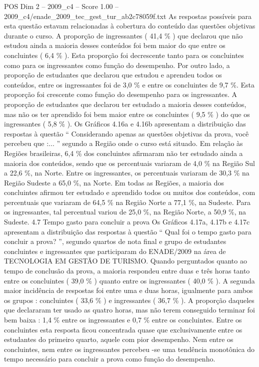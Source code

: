 \begin{textsample}{POS Dim 2 – 2009\_c4 – Score 1.00 – 2009\_c4/enade\_2009\_tec\_gest\_tur\_ab2c78059f.txt}
As respostas possíveis para esta questão estavam relacionadas à cobertura do conteúdo das questões objetivas durante o curso.
A proporção de ingressantes ( 41,4 \% ) que declarou que não estudou ainda a maioria desses conteúdos foi bem maior do que entre os concluintes ( 6,4 \% ).
Esta proporção foi decrescente tanto para os concluintes como para os ingressantes como função do desempenho.
Por outro lado, a proporção de estudantes que declarou que estudou e aprendeu todos os conteúdos, entre os ingressantes foi de 3,0 \% e entre os concluintes de 9,7 \%.
Esta proporção foi crescente como função do desempenho para os ingressantes.
A proporção de estudantes que declarou ter estudado a maioria desses conteúdos, mas não os ter aprendido foi bem maior entre os concluintes ( 9,5 \% ) do que os ingressantes ( 5,8 \% ).
Os Gráficos 4.16a e 4.16b apresentam a distribuição das respostas à questão “ Considerando apenas as questões objetivas da prova, você percebeu que :... ” segundo a Região onde o curso está situado.
Em relação às Regiões brasileiras, 6,4 \% dos concluintes afirmaram não ter estudado ainda a maioria dos conteúdos, sendo que os percentuais variaram de 4,0 \% na Região Sul a 22,6 \%, na Norte.
Entre os ingressantes, os percentuais variaram de 30,3 \% na Região Sudeste a 65,0 \%, na Norte.
Em todas as Regiões, a maioria dos concluintes afirmou ter estudado e aprendido todos ou muitos dos conteúdos, com percentuais que variaram de 64,5 \% na Região Norte a 77,1 \%, na Sudeste.
Para os ingressantes, tal percentual variou de 25,0 \%, na Região Norte, a 50,9 \%, na Sudeste. 4.7 Tempo gasto para concluir a prova Os Gráficos 4.17a, 4.17b e 4.17c apresentam a distribuição das respostas à questão “ Qual foi o tempo gasto para concluir a prova? ”, segundo quartos de nota final e grupo de estudantes concluintes e ingressantes que participaram do ENADE/2009 na área de TECNOLOGIA EM GESTÃO DE TURISMO.
Quando perguntados quanto ao tempo de conclusão da prova, a maioria respondeu entre duas e três horas tanto entre os concluintes ( 39,0 \% ) quanto entre os ingressantes ( 40,0 \% ).
A segunda maior incidência de respostas foi entre uma e duas horas, igualmente para ambos os grupos : concluintes ( 33,6 \% ) e ingressantes ( 36,7 \% ).
A proporção daqueles que declararam ter usado as quatro horas, mas não terem conseguido terminar foi bem baixa : 1,4 \% entre os ingressantes e 0,7 \% entre os concluintes.
Entre os concluintes esta resposta ficou concentrada quase que exclusivamente entre os estudantes do primeiro quarto, aquele com pior desempenho.
Nem entre os concluintes, nem entre os ingressantes percebeu -se uma tendência monotônica do tempo necessário para concluir a prova como função do desempenho.

\end{textsample}
